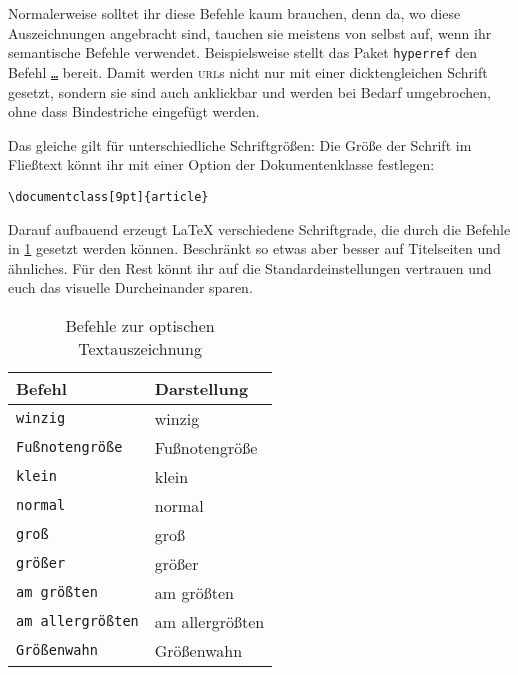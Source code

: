 Normalerweise solltet ihr diese Befehle kaum brauchen, denn da, wo diese Auszeichnungen angebracht sind, tauchen sie meistens von selbst auf, wenn ihr semantische Befehle verwendet.
Beispielsweise stellt das Paket \texttt{hyperref} den Befehl \texttt{\url{…}} bereit.
Damit werden \textsc{url}s nicht nur mit einer dickten\-gleichen Schrift gesetzt, sondern sie sind auch anklickbar und werden bei Bedarf umgebrochen, ohne dass Bindestriche eingefügt werden.

Das gleiche gilt für unterschiedliche Schriftgrößen: 
Die Größe der Schrift im Fließtext könnt ihr mit einer Option der Dokumentenklasse festlegen: 
\begin{verbatim}
\documentclass[9pt]{article}
\end{verbatim}
Darauf aufbauend erzeugt \LaTeX{} verschiedene Schriftgrade, die durch die Befehle in \cref{tbl:type-sizes} gesetzt werden können.
Beschränkt so etwas aber besser auf Titelseiten und ähnliches.
Für den Rest könnt ihr auf die Standardeinstellungen vertrauen und euch das visuelle Durcheinander sparen.

\begin{table}[H]
	\center
	\begin{tabular}{ll}
		\toprule
		Befehl & Darstellung \\
		\midrule
		\texttt{{\tiny winzig}} & {\tiny winzig} \\
		\texttt{{\footnotesize Fußnotengröße}} & {\footnotesize Fußnotengröße} \\
		\texttt{{\small klein}} & {\small klein} \\
		\texttt{{\normalsize normal}} & {\normalsize normal} \\
		\texttt{{\large groß}} & {\large groß} \\
		\texttt{{\Large größer}} & {\Large größer} \\
		\texttt{{\LARGE am größten}} & {\LARGE am größten} \\
		\texttt{{\huge am allergrößten}} & {\huge am allergrößten} \\
		\texttt{{\Huge Größenwahn}} & {\Huge Größenwahn} \\
		\bottomrule
	\end{tabular}
	\caption{Befehle zur optischen Textauszeichnung}
	\label{tbl:type-sizes}
\end{table}


